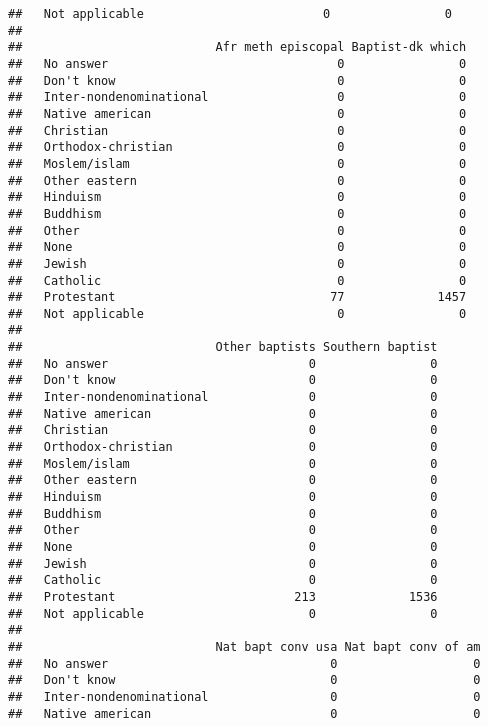 \documentclass[]{article}
\theoremstyle{definition}
\theoremstyle{definition}
\theoremstyle{definition}
\theoremstyle{remark}
\begin{document}
\begin{verbatim}
##   Not applicable                         0                0
##                          
##                           Afr meth episcopal Baptist-dk which
##   No answer                                0                0
##   Don't know                               0                0
##   Inter-nondenominational                  0                0
##   Native american                          0                0
##   Christian                                0                0
##   Orthodox-christian                       0                0
##   Moslem/islam                             0                0
##   Other eastern                            0                0
##   Hinduism                                 0                0
##   Buddhism                                 0                0
##   Other                                    0                0
##   None                                     0                0
##   Jewish                                   0                0
##   Catholic                                 0                0
##   Protestant                              77             1457
##   Not applicable                           0                0
##                          
##                           Other baptists Southern baptist
##   No answer                            0                0
##   Don't know                           0                0
##   Inter-nondenominational              0                0
##   Native american                      0                0
##   Christian                            0                0
##   Orthodox-christian                   0                0
##   Moslem/islam                         0                0
##   Other eastern                        0                0
##   Hinduism                             0                0
##   Buddhism                             0                0
##   Other                                0                0
##   None                                 0                0
##   Jewish                               0                0
##   Catholic                             0                0
##   Protestant                         213             1536
##   Not applicable                       0                0
##                          
##                           Nat bapt conv usa Nat bapt conv of am
##   No answer                               0                   0
##   Don't know                              0                   0
##   Inter-nondenominational                 0                   0
##   Native american                         0                   0

\end{verbatim}
\end{document}

